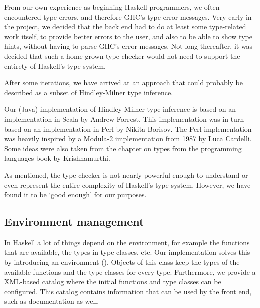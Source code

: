 From our own experience as beginning Haskell programmers, we often encountered type errors, and therefore GHC's type error messages.
Very early in the project, we decided that the back end had to do at least some type-related work itself, to provide better errors to the user, and also to be able to show type hints, without having to parse GHC's error messages.
Not long thereafter, it was decided that such a home-grown type checker would not need to support the entirety of Haskell's type system.

After some iterations, we have arrived at an approach that could probably be described as a subset of Hindley-Milner type inference.  

Our (Java) implementation of Hindley-Milner type inference is based on an implementation in Scala by Andrew Forrest\cite{forrest}.
This implementation was in turn based on an implementation in Perl by Nikita Borisov\cite{borisov}.
The Perl implementation was heavily inspired by a Modula-2 implementation from 1987 by Luca Cardelli\cite{cardelli}.
Some ideas were also taken from the chapter on types from the programming languages book by Krishnamurthi\cite{plai}.

As mentioned, the type checker is not nearly powerful enough to understand or even represent the entire complexity of Haskell's type system.
However, we have found it to be `good enough' for our purposes.

\subsection{Environment management}

In Haskell a lot of things depend on the environment, for example the functions that are available, the types in type classes, etc.
Our implementation solves this by introducing an environment ().
Objects of this class keep the types of the available functions and the type classes for every type.
Furthermore, we provide a XML-based catalog where the initial functions and type classes can be configured.
This catalog contains information that can be used by the front end, such as documentation as well.
